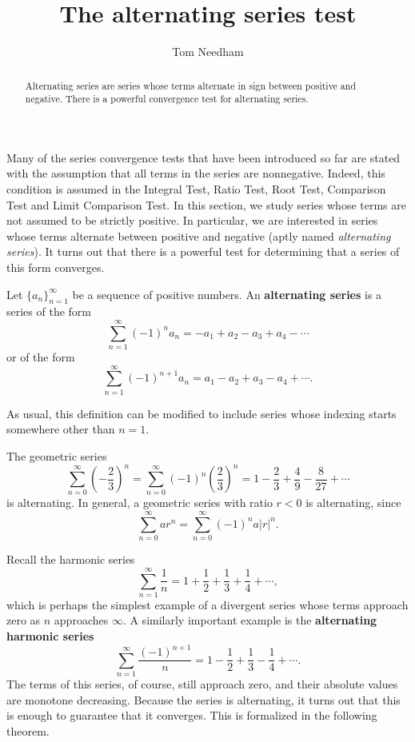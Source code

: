 \documentclass{ximera}
\title[Dig-In:]{The alternating series test}
\author{Tom Needham}
\begin{document}
\begin{abstract}
Alternating series are series whose terms alternate in sign between positive and negative. There is a powerful convergence test for alternating series. 
\end{abstract}
\maketitle

Many of the series convergence tests that have been introduced so far are stated with the assumption that all terms in the series are nonnegative. Indeed, this condition is assumed in the Integral Test, Ratio Test, Root Test, Comparison Test and Limit Comparison Test. In this section, we study series whose terms are not assumed to be strictly positive. In particular, we are interested in series whose terms alternate between positive and negative (aptly named \emph{alternating series}). It turns out that there is a powerful test for determining that a series of this form converges. 

\begin{definition}
Let $\{a_n\}_{n=1}^\infty$ be a sequence of positive numbers. An \textbf{alternating series} is
a series of the form 
\[
\sum_{n=1}^\infty (-1)^n a_n = -a_1 + a_2 - a_3 + a_4 - \cdots
\]
or of the form
$$
\sum_{n=1}^\infty (-1)^{n+1}a_n = a_1 - a_2 + a_3 - a_4 + \cdots.
$$

As usual, this definition can be modified to include series whose indexing starts somewhere other than $n=1$. 
\end{definition}

\begin{example}
The geometric series
$$
\sum_{n=0}^\infty \left(-\frac{2}{3}\right)^n = \sum_{n=0}^\infty \left(-1\right)^n \left(\frac{2}{3}\right)^n = 1 - \frac{2}{3} + \frac{4}{9} - \frac{8}{27} + \cdots
$$
is alternating. In general, a geometric series with ratio $r < 0$ is alternating, since
$$
\sum_{n=0}^\infty a r^n = \sum_{n=0}^\infty (-1)^n a  |r|^n.
$$
\end{example}

\begin{example}
Recall the harmonic series
$$
\sum_{n=1}^\infty \frac{1}{n} = 1 + \frac{1}{2} + \frac{1}{3} + \frac{1}{4} + \cdots,
$$
which is perhaps the simplest example of a divergent series whose terms approach zero as $n$ approaches $\infty$. 
A similarly important example is the \textbf{alternating harmonic series}
$$
\sum_{n=1}^\infty \frac{(-1)^{n+1}}{n} = 1 - \frac{1}{2} + \frac{1}{3} - \frac{1}{4} + \cdots.
$$
The terms of this series, of course, still approach zero, and their absolute values are monotone decreasing. Because the series is alternating, it turns out that this is enough to guarantee that it converges. This is formalized in the following theorem.
\end{example}
\end{document}
